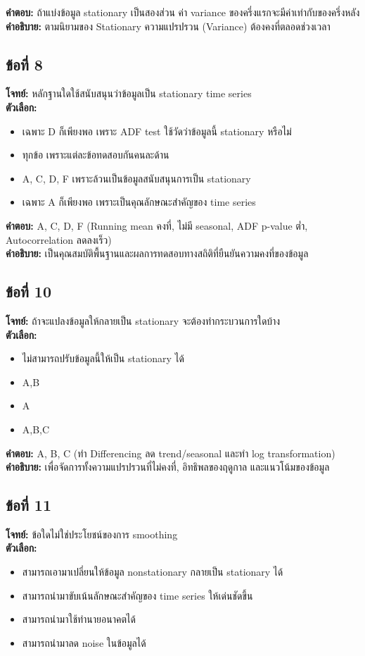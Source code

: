 \documentclass[12pt]{article}
\begin{document}
\textbf{คำตอบ:} ถ้าแบ่งข้อมูล stationary เป็นสองส่วน ค่า variance ของครึ่งแรกจะมีค่าเท่ากับของครึ่งหลัง\\
\textbf{คำอธิบาย:} ตามนิยามของ Stationary ความแปรปรวน (Variance) ต้องคงที่ตลอดช่วงเวลา

\subsection*{ข้อที่ 8}
\textbf{โจทย์:} หลักฐานใดใช้สนับสนุนว่าข้อมูลเป็น stationary time series\\
\textbf{ตัวเลือก:}
\begin{itemize}
    \item เฉพาะ D ก็เพียงพอ เพราะ ADF test ใช้วัดว่าข้อมูลนี้ stationary หรือไม่
    \item ทุกข้อ เพราะแต่ละข้อทดสอบกันคนละด้าน
    \item A, C, D, F เพราะล้วนเป็นข้อมูลสนับสนุนการเป็น stationary
    \item เฉพาะ A ก็เพียงพอ เพราะเป็นคุณลักษณะสำคัญของ time series
\end{itemize}

\textbf{คำตอบ:} A, C, D, F (Running mean คงที่, ไม่มี seasonal, ADF p-value ต่ำ, Autocorrelation ลดลงเร็ว)\\
\textbf{คำอธิบาย:} เป็นคุณสมบัติพื้นฐานและผลการทดสอบทางสถิติที่ยืนยันความคงที่ของข้อมูล

\subsection*{ข้อที่ 10}
\textbf{โจทย์:} ถ้าจะแปลงข้อมูลให้กลายเป็น stationary จะต้องทำกระบวนการใดบ้าง\\
\textbf{ตัวเลือก:}
\begin{itemize}
    \item ไม่สามารถปรับข้อมูลนี้ให้เป็น stationary ได้
    \item A,B
    \item A
    \item A,B,C
\end{itemize}

\textbf{คำตอบ:} A, B, C (ทำ Differencing ลด trend/seasonal และทำ log transformation)\\
\textbf{คำอธิบาย:} เพื่อจัดการทั้งความแปรปรวนที่ไม่คงที่, อิทธิพลของฤดูกาล และแนวโน้มของข้อมูล

\subsection*{ข้อที่ 11}
\textbf{โจทย์:} ข้อใดไม่ใช่ประโยชน์ของการ smoothing\\
\textbf{ตัวเลือก:}
\begin{itemize}
    \item สามารถเอามาเปลี่ยนให้ข้อมูล nonstationary กลายเป็น stationary ได้
    \item สามารถนำมาขับเน้นลักษณะสำคัญของ time series ให้เด่นชัดขึ้น
    \item สามารถนำมาใช้ทำนายอนาคตได้
    \item สามารถนำมาลด noise ในข้อมูลได้
\end{itemize}
\end{document}
